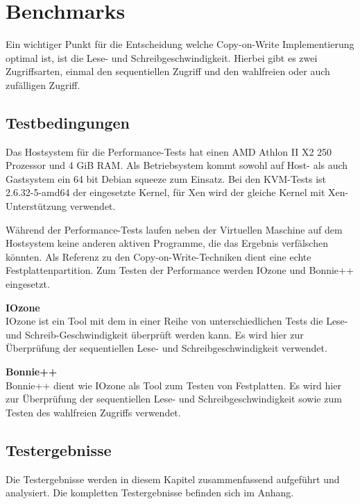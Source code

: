 \section{Benchmarks}
Ein wichtiger Punkt für die Entscheidung welche Copy-on-Write Implementierung optimal ist, ist die Lese- und Schreibgeschwindigkeit. Hierbei gibt es zwei Zugriffsarten, einmal den sequentiellen Zugriff und den wahlfreien oder auch zufälligen Zugriff. 

\subsection{Testbedingungen}
Das Hostsystem für die Performance-Tests hat einen AMD Athlon II X2 250 Prozessor und 4 GiB RAM. Als Betriebsystem kommt sowohl auf Host- als auch Gastsystem ein 64 bit Debian squeeze zum Einsatz. Bei den KVM-Tests ist 2.6.32-5-amd64 der eingesetzte Kernel, für Xen wird der gleiche Kernel mit Xen-Unterstützung verwendet.

Während der Performance-Tests laufen neben der Virtuellen Maschine auf dem Hostsystem keine anderen aktiven Programme, die das Ergebnis verfälschen könnten. Als Referenz zu den Copy-on-Write-Techniken dient eine echte Festplattenpartition. Zum Testen der Performance werden IOzone und Bonnie++ eingesetzt.

\textbf{IOzone} \\
IOzone ist ein Tool mit dem in einer Reihe von unterschiedlichen Tests die Lese- und Schreib-Geschwindigkeit überprüft werden kann. Es wird hier zur Überprüfung der sequentiellen Lese- und Schreibgeschwindigkeit verwendet.

\textbf{Bonnie++} \\
Bonnie++ dient wie IOzone als Tool zum Testen von Festplatten. Es wird hier zur Überprüfung der sequentiellen Lese- und Schreibgeschwindigkeit sowie zum Testen des wahlfreien Zugriffs verwendet.

\subsection{Testergebnisse}
Die Testergebnisse werden in diesem Kapitel zusammenfassend aufgeführt und analysiert. Die kompletten Testergebnisse befinden sich im Anhang.

\begin{comment} Bei dem Iozone-Test wurden Dateigrößen von 512 MB, 2 GB, 4 Gb und 8 GB verwendet. Für die Entscheidungsfindung wird jedoch nur der Test mit 8 GB Dateigröße herangezogen. \end{comment}

